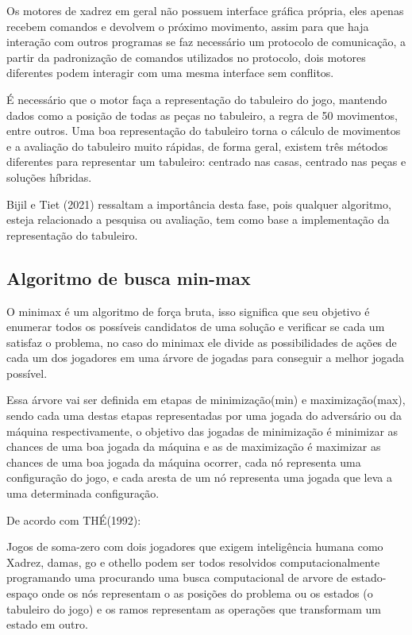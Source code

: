 Os motores de xadrez em geral não possuem interface gráfica própria, eles apenas recebem comandos e devolvem o próximo
movimento, assim para que haja interação com outros programas se faz necessário um protocolo de comunicação, a partir
da padronização de comandos utilizados no protocolo, dois motores diferentes podem interagir com uma mesma interface
sem conflitos.

É necessário que o motor faça a representação do tabuleiro do jogo, mantendo dados como a posição de todas as peças no tabuleiro,
a regra de 50 movimentos, entre outros. Uma boa representação do tabuleiro torna o cálculo de movimentos e a avaliação do tabuleiro
muito rápidas, de forma geral, existem três métodos diferentes para representar um tabuleiro: centrado nas casas, centrado nas peças
e soluções híbridas.

Bijil e Tiet (2021) ressaltam a importância desta fase, pois qualquer algoritmo, esteja relacionado a pesquisa
ou avaliação, tem como base a implementação da representação do tabuleiro.

\subsection{Algoritmo de busca min-max}

O minimax é um algoritmo de força bruta, isso significa que seu objetivo é enumerar todos os possíveis candidatos de uma solução e verificar
se cada um satisfaz o problema, no caso do minimax ele divide as possibilidades de ações de cada um dos jogadores em uma árvore de jogadas para
conseguir a melhor jogada possível.

Essa árvore vai ser definida em etapas de minimização(min) e maximização(max), sendo cada uma destas etapas representadas por uma jogada do
adversário ou da máquina respectivamente, o objetivo das jogadas de minimização é minimizar as chances de uma boa jogada da máquina e as de
maximização é maximizar as chances de uma boa jogada da máquina ocorrer, cada nó representa uma configuração do jogo, e cada aresta de um nó representa
uma jogada que leva a uma determinada configuração.

De acordo com THÉ(1992):
\begin{citacao}
    Jogos de soma-zero com dois jogadores que exigem inteligência humana como Xadrez, damas, go e othello
    podem ser todos resolvidos computacionalmente programando uma procurando uma busca computacional de
    arvore de estado-espaço onde os nós representam o as posições do problema ou os estados (o tabuleiro do jogo)
    e os ramos representam as operações que transformam um estado em outro.\cite[tradução nossa.]{ERICTHE}
\end{citacao}


